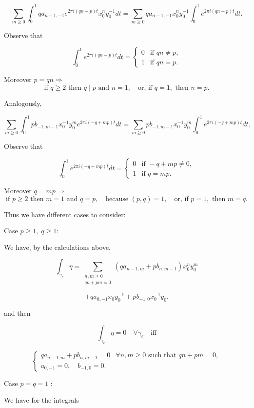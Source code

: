 \documentclass[11pt,a4paper]{amsart}
\theoremstyle{definition}
\begin{document}
\[
\sum_{m\ge 0}
\int_0^1
q a_{n-1,-1}
e^{2\pi i(qn-p)t}
x_0^n y_0^{-1} dt
=
\sum_{m\ge 0}
q a_{n-1,-1} x_0^n y_0^{-1}
\int_0^1 e^{2\pi i(qn-p)t} dt .
\]

Observe that

\[
\int_0^1 e^{2\pi i(qn-p)t} dt
=
\begin{cases}
0 & \text{if } qn\neq p,\\
1 & \text{if } qn=p.
\end{cases}
\]

Moreover $p=qn \Rightarrow$
\[
\text{if } q\ge 2 \text{ then } q\mid p \text{ and } n=1,
\quad
\text{or, if } q=1, \text{ then } n=p.
\]


Analogously,

\[
\sum_{m\ge 0}
\int_0^1
p b_{-1,m-1}
x_0^{-1} y_0^m
e^{2\pi i(-q+mp)t} dt
=
\sum_{m\ge 0}
p b_{-1,m-1} x_0^{-1} y_0^m
\int_0^1 e^{2\pi i(-q+mp)t} dt .
\]

Observe that

\[
\int_0^1 e^{2\pi i(-q+mp)t} dt
=
\begin{cases}
0 & \text{if } -q+mp\neq 0,\\
1 & \text{if } q=mp.
\end{cases}
\]


Moreover $q=mp \Rightarrow$
\[
\text{if } p\ge 2 \text{ then } m=1 \text{ and } q=p,
\quad
\text{because } (p,q)=1,
\quad
\text{or, if } p=1, \text{ then } m=q.
\]


Thus we have different cases to consider:

Case $p\ge 1,\; q\ge 1$:

We have, by the calculations above,

\[
\int_{\gamma_c}\eta
=
\sum_{\substack{n,m\ge 0\\ qn+pm=0}}
(q a_{n-1,m}+p b_{n,m-1}) x_0^n y_0^m
\]

\[
+
q a_{0,-1} x_0 y_0^{-1}
+
p b_{-1,0} x_0^{-1} y_0 .
\]

and then

\[
\int_{\gamma_c}\eta=0 \quad \forall \gamma_c
\quad \text{iff}
\]

\[
\begin{cases}
q a_{n-1,m}+p b_{n,m-1}=0
& \forall n,m\ge 0 \text{ such that } qn+pm=0,\\[6pt]
a_{0,-1}=0,\quad b_{-1,0}=0.
\end{cases}
\]

Case $p=q=1$ :

We have for the integrals
\end{document}
